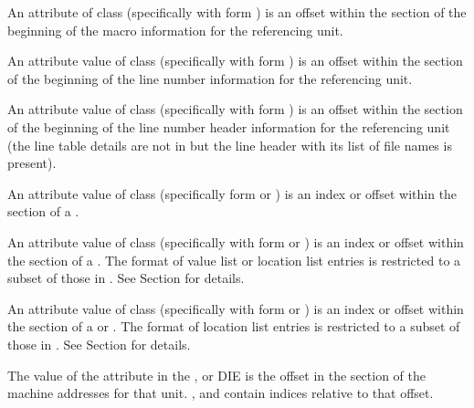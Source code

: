 \begin{description}
An attribute of class \CLASSmacptr{} (specifically \DWATmacros{} 
with form \DWFORMsecoffset{}) is an offset within the 
\dotdebugmacrodwo{} section of the beginning of the macro 
information for the referencing unit.

An attribute value of class \CLASSlineptr{} (specifically 
\DWATstmtlist{} with form \DWFORMsecoffset) 
is an offset within the \dotdebugline{} section of the 
beginning of the line number information for the 
referencing unit.

An attribute value of class \CLASSlineptr{} (specifically  
\DWATstmtlist{}  with form \DWFORMsecoffset) 
is an offset within the \dotdebuglinedwo{} section of the 
beginning of the line number header information 
for the referencing unit (the line table details are not in 
\dotdebuglinedwo{} but the line header with its list 
of file names is present).

\bb
{}
An attribute value of class \CLASSrnglist{} 
(specifically form \DWFORMrnglistx{} or \DWFORMsecoffset) 
is an index or offset within the \dotdebugrnglists{} 
section of a .
\eb

An attribute value of class \CLASSrnglist{} (specifically 
\DWATranges{} with form \DWFORMrnglistx{} or \DWFORMsecoffset) 
is an index or offset within the \dotdebugrnglistsdwo{}
section of a .
The format of \dotdebugrnglistsdwo{} 
\bb
value list or
\eb
location list entries 
is restricted to a subset of those in \dotdebugrnglists.
See Section  for details.

An attribute value of class 
\CLASSloclist{} (specifically with form \DWFORMloclistx{}
or \DWFORMsecoffset) 
is an index or offset within the \dotdebugloclistsdwo{} 
section of a 
\bb
{} or
\eb
{}.
The format of \dotdebugloclistsdwo{} location list entries 
is restricted to a subset of those in \dotdebugloclists.
See Section  for details.

The value of the \DWATaddrbase{} attribute in the 
\DWTAGcompileunit, \DWTAGpartialunit{} or \DWTAGtypeunit{} DIE 
is the offset in the \dotdebugaddr{} section of the machine 
addresses for that unit.
\DWFORMaddrxXN, \DWOPaddrx{} and \DWOPconstx{} contain indices 
relative to that offset.


\end{description}
